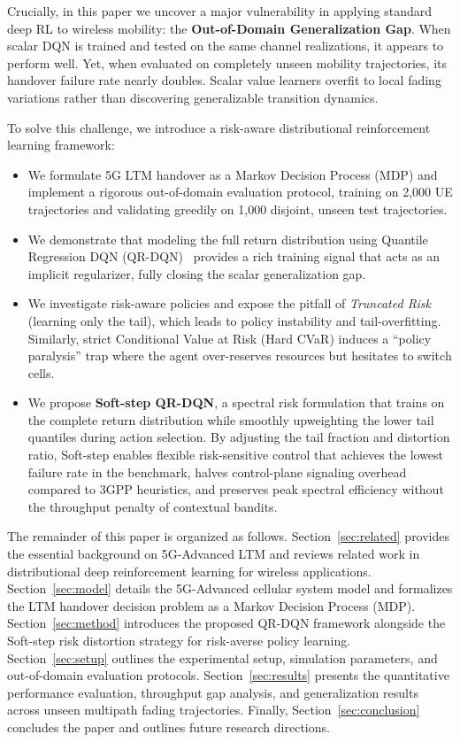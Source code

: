 \documentclass{ieeetmlcn}
\begin{document}
Crucially, in this paper we uncover a major vulnerability in applying standard deep RL to wireless mobility: the \textbf{Out-of-Domain Generalization Gap}. When scalar DQN is trained and tested on the same channel realizations, it appears to perform well. Yet, when evaluated on completely unseen mobility trajectories, its handover failure rate nearly doubles. Scalar value learners overfit to local fading variations rather than discovering generalizable transition dynamics.

To solve this challenge, we introduce a risk-aware distributional reinforcement learning framework:
\begin{itemize}
  \item We formulate 5G LTM handover as a Markov Decision Process (MDP) and implement a rigorous out-of-domain evaluation protocol, training on 2,000 UE trajectories and validating greedily on 1,000 disjoint, unseen test trajectories.
  \item We demonstrate that modeling the full return distribution using Quantile Regression DQN (QR-DQN)~\cite{qrdqn} provides a rich training signal that acts as an implicit regularizer, fully closing the scalar generalization gap.
  \item We investigate risk-aware policies and expose the pitfall of \emph{Truncated Risk} (learning only the tail), which leads to policy instability and tail-overfitting. Similarly, strict Conditional Value at Risk (Hard CVaR) induces a ``policy paralysis'' trap where the agent over-reserves resources but hesitates to switch cells.
  \item We propose \textbf{Soft-step QR-DQN}, a spectral risk formulation that trains on the complete return distribution while smoothly upweighting the lower tail quantiles during action selection. By adjusting the tail fraction and distortion ratio, Soft-step enables flexible risk-sensitive control that achieves the lowest failure rate in the benchmark, halves control-plane signaling overhead compared to 3GPP heuristics, and preserves peak spectral efficiency without the throughput penalty of contextual bandits.
\end{itemize}

The remainder of this paper is organized as follows. Section~\ref{sec:related} provides the essential background on 5G-Advanced LTM and reviews related work in distributional deep reinforcement learning for wireless applications. Section~\ref{sec:model} details the 5G-Advanced cellular system model and formalizes the LTM handover decision problem as a Markov Decision Process (MDP). Section~\ref{sec:method} introduces the proposed QR-DQN framework alongside the Soft-step risk distortion strategy for risk-averse policy learning. Section~\ref{sec:setup} outlines the experimental setup, simulation parameters, and out-of-domain evaluation protocols. Section~\ref{sec:results} presents the quantitative performance evaluation, throughput gap analysis, and generalization results across unseen multipath fading trajectories. Finally, Section~\ref{sec:conclusion} concludes the paper and outlines future research directions.
\end{document}
